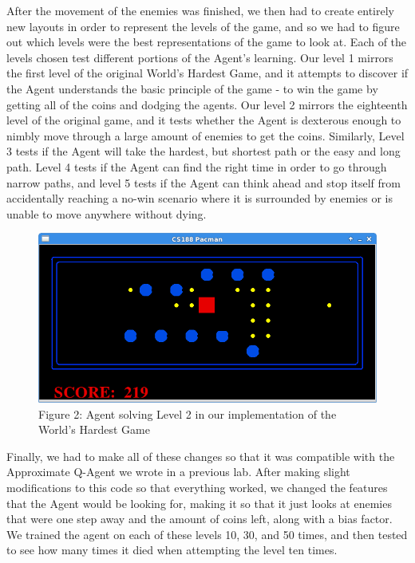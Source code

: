 \documentclass[11pt]{article}
\begin{document}
After the movement of the enemies was finished, we then had to create entirely new layouts in order to represent the levels of the game, and so we had to figure out which levels were the best representations of the game to look at. Each of the levels chosen test different portions of the Agent's learning. Our level 1 mirrors the first level of the original World's Hardest Game, and it attempts to discover if the Agent understands the basic principle of the game - to win the game by getting all of the coins and dodging the agents. Our level 2 mirrors the eighteenth level of the original game, and it tests whether the Agent is dexterous enough to nimbly move through a large amount of enemies to get the coins. Similarly, Level 3 tests if the Agent will take the hardest, but shortest path or the easy and long path. Level 4 tests if the Agent can find the right time in order to go through narrow paths, and level 5 tests if the Agent can think ahead and stop itself from accidentally reaching a no-win scenario where it is surrounded by enemies or is unable to move anywhere without dying. \newline
\begin{figure}[t]
\centering

\includegraphics[scale = .5]{WHGL2.png} \newline \newline
Figure 2: Agent solving Level 2 in our implementation of the World's Hardest Game
\end{figure}
Finally, we had to make all of these changes so that it was compatible with the  Approximate Q-Agent we wrote in a previous lab. After making slight modifications to this code so that everything worked, we changed the features that the Agent would be looking for, making it so that it just looks at enemies that were one step away and the amount of coins left, along with a bias factor. We trained the agent on each of these levels 10, 30, and 50 times, and then tested to see how many times it died when attempting the level ten times. 
\end{document}
